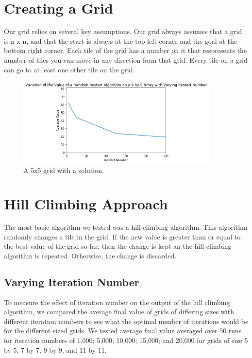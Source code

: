 \documentclass[12pt]{article}
\begin{document}
\section*{Creating a Grid}

Our grid relies on several key assumptions. Our grid always assumes that a grid is n x n, and that the start is always at the top left corner and the goal at the bottom right corner. Each tile of the grid has a number on it that respresents the number of tiles you can move in any direction form that grid. Every tile on a grid can go to at least one other tile on the grid.

\begin{figure}[h]
    \centering
    \includegraphics[width=0.9\textwidth]{random_restarts_9x9_restarts}
    \caption{A 5x5 grid with a solution.}
    \label{fig:5x5_solution}
\end{figure}

\section*{Hill Climbing Approach}

The most basic algorithm we tested was a hill-climbing algorithm. This algorithm randomly changes a tile in the grid. If the new value is greater than or equal to the best value of the grid so far, then the change is kept an the hill-climbing algorithm is repeated. Otherwise, the change is discarded. 

\subsection*{Varying Iteration Number}

To measure the effect of iteration number on the output of the hill climbing algorithm, we compared the average final value of grids of differing sizes with different iteration numbers to see what the optimal number of iterations would be for the different sized grids. We tested average final value averaged over 50 runs for iteration numbers of 1,000; 5,000; 10,000; 15,000; and 20,000 for grids of size 5 by 5, 7 by 7, 9 by 9, and 11 by 11.
\end{document}

